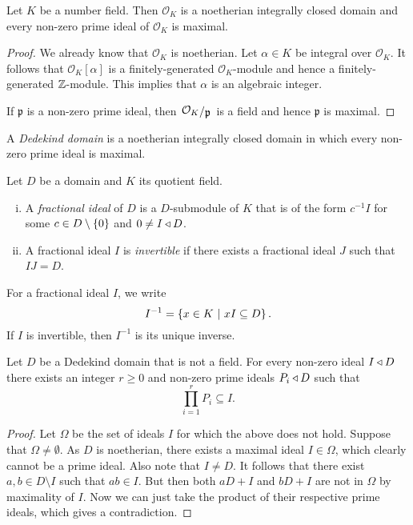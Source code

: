 \begin{izrek}
Let $K$ be a number field. Then $\mathcal{O}_K$ is a noetherian
integrally closed domain and every non-zero prime ideal of
$\mathcal{O}_K$ is maximal.
\end{izrek}

\begin{proof}
We already know that $\mathcal{O}_K$ is noetherian. Let
$\alpha \in K$ be integral over $\mathcal{O}_K$. It follows that
$\mathcal{O}_K[\alpha]$ is a finitely-generated
$\mathcal{O}_K$-module and hence a finitely-generated $\mathbb{Z}$-module.
This implies that $\alpha$ is an algebraic integer.

If $\mathfrak{p}$ is a non-zero prime ideal, then
$\kvoc{\mathcal{O}_K}{\mathfrak{p}}$ is a field and hence
$\mathfrak{p}$ is maximal.
\end{proof}

\begin{definicija}
A \emph{Dedekind domain} is a noetherian
integrally closed domain in which every non-zero prime ideal is
maximal.
\end{definicija}

\begin{definicija}
Let $D$ be a domain and $K$ its quotient field.

\begin{enumerate}[i)]
\item A \emph{fractional ideal} of $D$ is a
$D$-submodule of $K$ that is of the form $c^{-1} I$ for some
$c \in D \setminus \left\{0\right\}$ and $0 \ne I \triangleleft D$.
\item A fractional ideal $I$ is \emph{invertible} if there exists
a fractional ideal $J$ such that $IJ = D$.
\end{enumerate}
\end{definicija}

\begin{opomba}
For a fractional ideal $I$, we write
\[
I^{-1} = \left\{x \in K~\middle\vert~xI \subseteq D\right\}.
\]
If $I$ is invertible, then $I^{-1}$ is its unique inverse.
\end{opomba}

\begin{lema}
Let $D$ be a Dedekind domain that is not a field. For every
non-zero ideal $I \triangleleft D$ there exists an integer $r \geq 0$ and
non-zero prime ideals $P_i \triangleleft D$ such that
\[
\prod_{i=1}^r P_i \subseteq I.
\]
\end{lema}

\begin{proof}
Let $\Omega$ be the set of ideals $I$ for which the above does not
hold. Suppose that $\Omega \ne \emptyset$. As $D$ is noetherian,
there exists a maximal ideal $I \in \Omega$, which clearly cannot
be a prime ideal. Also note that $I \ne D$. It follows that there
exist $a, b \in D \setminus I$ such that $ab \in I$. But then both
$aD + I$ and $bD + I$ are not in $\Omega$ by maximality of $I$. Now
we can just take the product of their respective prime ideals,
which gives a contradiction.
\end{proof}

